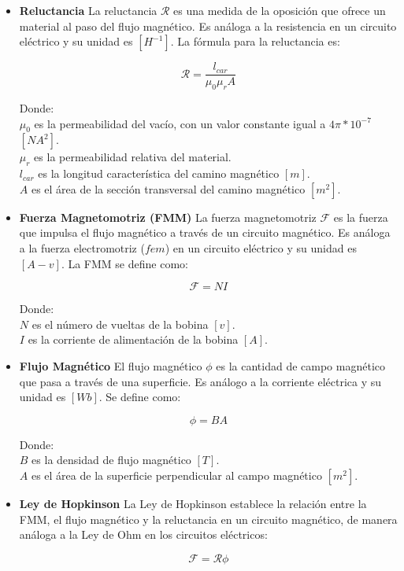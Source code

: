 \begin{itemize}
    \item \textbf{Reluctancia}
    La reluctancia \(\mathcal{R}\) es una medida de la oposición que ofrece un material al paso del flujo magnético. Es análoga a la resistencia en un circuito eléctrico y su unidad es \([H^{-1}]\). La fórmula para la reluctancia es:
    
    \[\mathcal{R}=\frac{l_{car}}{\mu_0\mu_r A}\] 
    
    Donde:\\
    \(\mu_0\) es la permeabilidad del vacío, con un valor constante igual a \(4\pi*10^{-7}\) \([NA^2]\).\\
    \(\mu_r\) es la permeabilidad relativa del material.\\
    \(l_{car}\) es la longitud característica del camino magnético \([m]\).\\
    \(A\) es el área de la sección transversal del camino magnético \([m^2]\).\\

    \item \textbf{Fuerza Magnetomotriz (FMM)}
    La fuerza magnetomotriz \(\mathcal{F}\) es la fuerza que impulsa el flujo magnético a través de un circuito magnético. Es análoga a la fuerza electromotriz (\(fem\)) en un circuito eléctrico y su unidad es \([A-v]\). La FMM se define como:
    
    \[\mathcal{F}=NI\]
    
    Donde:\\
    \(N\) es el número de vueltas de la bobina \([v]\).\\
    \(I\) es la corriente de alimentación de la bobina \([A]\).\\

    \item \textbf{Flujo Magnético}
    El flujo magnético \(\phi\) es la cantidad de campo magnético que pasa a través de una superficie. Es análogo a la corriente eléctrica y su unidad es \([Wb]\). Se define como:
    
    \[\phi = BA\]
    
    Donde:\\
    \(B\) es la densidad de flujo magnético \([T]\).\\
    \(A\) es el área de la superficie perpendicular al campo magnético \([m^2]\).\\

    \item \textbf{Ley de Hopkinson}
    La Ley de Hopkinson establece la relación entre la FMM, el flujo magnético y la reluctancia en un circuito magnético, de manera análoga a la Ley de Ohm en los circuitos eléctricos:
    
    \[\mathcal{F}=\mathcal{R}\phi\]
\end{itemize}

